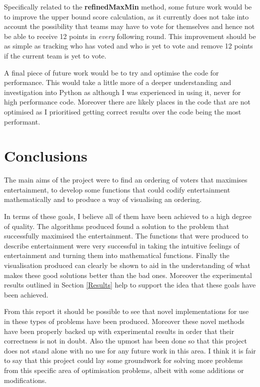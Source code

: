 \documentclass[12pt]{report}
\begin{document}
Specifically related to the \textbf{refinedMaxMin} method, some future work would be to improve the upper bound score calculation, as it currently does not take into account the possibility that teams may have to vote for themselves and hence not be able to receive 12 points in \textit{every} following round. This improvement should be as simple as tracking who has voted and who is yet to vote and remove 12 points if the current team is yet to vote.

A final piece of future work would be to try and optimise the code for performance. This would take a little more of a deeper understanding and investigation into Python as although I was experienced in using it, never for high performance code. Moreover there are likely places in the code that are not optimised as I prioritised getting correct results over the code being the most performant.

\section{Conclusions}\label{Conclusions}
The main aims of the project were to find an ordering of voters that maximises entertainment, to develop some functions that could codify entertainment mathematically and to produce a way of visualising an ordering.

In terms of these goals, I believe all of them have been achieved to a high degree of quality. The algorithms produced found a solution to the problem that successfully maximised the entertainment. The functions that were produced to describe entertainment were very successful in taking the intuitive feelings of entertainment and turning them into mathematical functions. Finally the visualisation produced can clearly be shown to aid in the understanding of what makes these good solutions better than the bad ones. Moreover the experimental results outlined in Section \ref{Results} help to support the idea that these goals have been achieved.

From this report it should be possible to see that novel implementations for use in these types of problems have been produced. Moreover these novel methods have been properly backed up with experimental results in order that their correctness is not in doubt. Also the upmost has been done so that this project does not stand alone with no use for any future work in this area. I think it is fair to say that this project could lay some groundwork for solving more problems from this specific area of optimisation problems, albeit with some additions or modifications.
\end{document}
